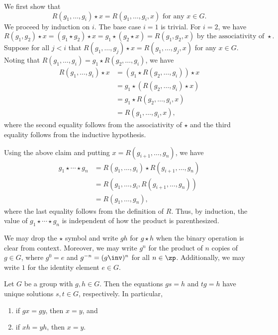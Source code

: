 \begin{proofnum}
    We first show that
    \[
        R(g_1, \ldots, g_i) \star x = R(g_1, \ldots, g_i, x) \text{ for any } x \in G.
    \]
    We proceed by induction on $i$.
    The base case $i = 1$ is trivial.
    For $i = 2$, we have 
    \[
        R(g_1, g_2) \star x = (g_1 \star g_2) \star x = g_1 \star (g_2 \star x) = R(g_1, g_2, x) \text{ by the associativity of } \star.
    \]
    Suppose for all $j < i$ that $R(g_1, \ldots, g_j) \star x = R(g_1, \ldots, g_j, x)$ for any $x \in G$.
    Noting that $R(g_1, \ldots, g_i) = g_1 \star R(g_2, \ldots, g_i)$, we have
    \begin{align*}
        R(g_1, \ldots, g_i) \star x &= (g_1 \star R(g_2, \ldots, g_i)) \star x \\
        &= g_1 \star (R(g_2, \ldots, g_i) \star x) \\
        &= g_1 \star R(g_2, \ldots, g_i, x) \\
        &= R(g_1, \ldots, g_i, x),
    \end{align*}
    where the second equality follows from the associativity of $\star$ and the third equality follows from the inductive hypothesis.

    Using the above claim and putting $x = R(g_{i + 1}, \ldots, g_n)$, we have
    \begin{align*}
        g_1 \star \cdots \star g_n &= R(g_1, \ldots, g_i) \star R(g_{i + 1}, \ldots, g_n) \\
        &= R(g_1, \ldots, g_i, R(g_{i + 1}, \ldots, g_n)) \\
        &= R(g_1, \ldots, g_n),
    \end{align*}
    where the last equality follows from the definition of $R$.
    Thus, by induction, the value of $g_1 \star \cdots \star g_n$ is independent of how the product is parenthesized.
\end{proofnum}

\begin{note}
    We may drop the $\star$ symbol and write $gh$ for $g \star h$ when the binary operation is clear from context.
    Moreover, we may write $g^n$ for the product of $n$ copies of $g \in G$, where $g^0 = e$ and $g^{-n} = (g\inv)^n$ for all $n \in \zp$.
    Additionally, we may write $1$ for the identity element $e \in G$.
\end{note}

\begin{proposition}
    Let $G$ be a group with $g, h \in G$.
    Then the equations $gs = h$ and $tg = h$ have unique solutions $s, t \in G$, respectively.
    In particular,
    \begin{enumerate}
        \item if $gx = gy$, then $x = y$, and
        \item if $xh = yh$, then $x = y$.
    \end{enumerate}
\end{proposition}


